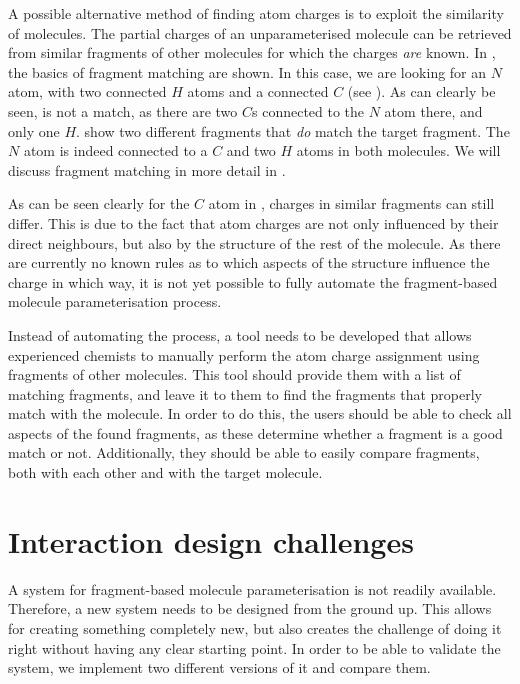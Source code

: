 A possible alternative method of finding atom charges is to exploit the similarity of molecules. The partial charges of an unparameterised molecule can be retrieved from similar fragments of other molecules for which the charges \emph{are} known. In , the basics of fragment matching are shown. In this case, we are looking for an $N$ atom, with two connected $H$ atoms and a connected $C$ (see ). As can clearly be seen,  is not a match, as there are two $C$s connected to the $N$ atom there, and only one $H$.  show two different fragments that \emph{do} match the target fragment. The $N$ atom is indeed connected to a $C$ and two $H$ atoms in both molecules. We will discuss fragment matching in more detail in .

As can be seen clearly for the $C$ atom in , charges in similar fragments can still differ. This is due to the fact that atom charges are not only influenced by their direct neighbours, but also by the structure of the rest of the molecule. As there are currently no known rules as to which aspects of the structure influence the charge in which way, it is not yet possible to fully automate the fragment-based molecule parameterisation process.

Instead of automating the process, a tool needs to be developed that allows experienced chemists to manually perform the atom charge assignment using fragments of other molecules. This tool should provide them with a list of matching fragments, and leave it to them to find the fragments that properly match with the molecule. In order to do this, the users should be able to check all aspects of the found fragments, as these determine whether a fragment is a good match or not. Additionally, they should be able to easily compare fragments, both with each other and with the target molecule.



\section[Challenges]{Interaction design challenges}
A system for fragment-based molecule parameterisation is not readily available. Therefore, a new system needs to be designed from the ground up. This allows for creating something completely new, but also creates the challenge of doing it right without having any clear starting point. In order to be able to validate the system, we implement two different versions of it and compare them.

